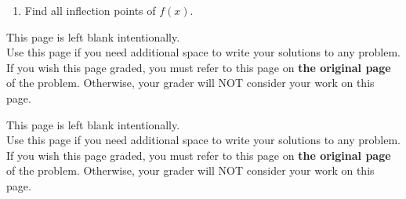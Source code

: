 \documentclass[11pt]{article}
\begin{document}
\begin{enumerate}
\begin{enumerate}
    \vspace{6cm}

    \item Find all inflection points of $f(x)$.

\end{enumerate}



\newpage

This page is left blank intentionally.\\

Use this page if you need additional space to write your solutions to any problem. \\

If you wish this page graded, you must refer to this page on \textbf{the original page} of the problem. Otherwise, your grader will NOT consider your work on this page.

\newpage

This page is left blank intentionally.\\

Use this page if you need additional space to write your solutions to any problem. \\

If you wish this page graded, you must refer to this page on \textbf{the original page} of the problem. Otherwise, your grader will NOT consider your work on this page.

\end{enumerate}
\end{document}
